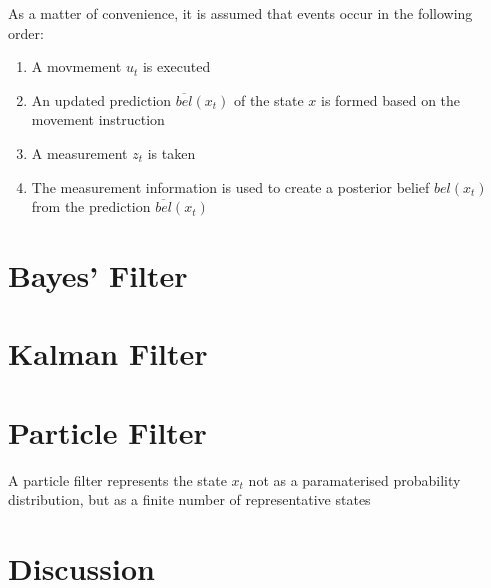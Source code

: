 \documentclass[english]{article}
\begin{document}
As a matter of convenience, it is assumed that events occur in the following order:
\begin{enumerate}
  \item A movmement $u_t$ is executed 
  \item An updated prediction $\overline{bel}(x_t)$ of the state $x$ is formed based on the movement instruction
  \item A measurement $z_t$ is taken
  \item The measurement information is used to create a posterior belief $bel(x_t)$ from the prediction $\overline{bel}(x_t)$
\end{enumerate}



\section*{Bayes' Filter}


\section*{Kalman Filter}


\section*{Particle Filter}

A particle filter represents the state $x_t$ not as a paramaterised probability distribution, but as a finite number of representative states



\section*{Discussion}
\end{document}

